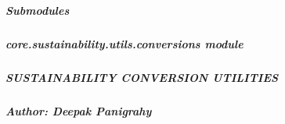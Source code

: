 \documentclass[letterpaper,10pt,english]{sphinxmanual}
\begin{document}
\subparagraph{Submodules}
\label{\detokenize{core.sustainability.utils:submodules}}
\sphinxstepscope


\subparagraph{core.sustainability.utils.conversions module}
\label{\detokenize{core.sustainability.utils.conversions:module-core.sustainability.utils.conversions}}\label{\detokenize{core.sustainability.utils.conversions:core-sustainability-utils-conversions-module}}\label{\detokenize{core.sustainability.utils.conversions::doc}}

\subparagraph{SUSTAINABILITY CONVERSION UTILITIES}
\label{\detokenize{core.sustainability.utils.conversions:sustainability-conversion-utilities}}

\subparagraph{Author: Deepak Panigrahy}
\label{\detokenize{core.sustainability.utils.conversions:author-deepak-panigrahy}}
\end{document}
